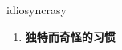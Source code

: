 
\begin{frame}
{\huge idiosyncrasy}
\begin{center}
\begin{enumerate}\Large
  \item \textbf{独特而奇怪的习惯}
\end{enumerate}
\end{center}
\end{frame}
